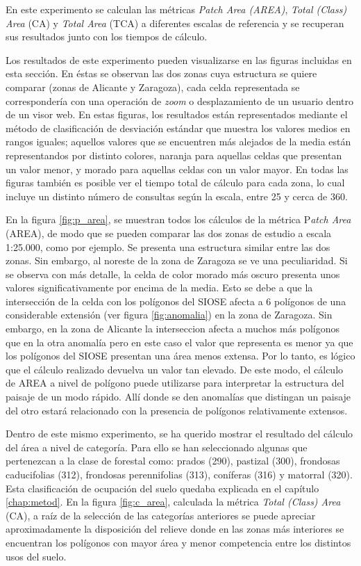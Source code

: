 En este experimento se calculan las métricas \textit{Patch Area (AREA)}, \textit{Total (Class) Area} (CA) y \textit{Total Area} (TCA) a diferentes escalas de referencia y se recuperan sus resultados junto con los tiempos de cálculo. 

Los resultados de este experimento pueden visualizarse en las figuras incluidas en esta sección. En éstas se observan las dos zonas cuya estructura se quiere comparar (zonas de Alicante y Zaragoza), cada celda representada se correspondería con una operación de \textit{zoom} o desplazamiento de un usuario dentro de un visor web. En estas figuras, los resultados están representados mediante el método de clasificación de desviación estándar que muestra los valores medios en rangos iguales; aquellos valores que se encuentren más alejados de la media están representandos por distinto colores, naranja para aquellas celdas que presentan un valor menor, y morado para aquellas celdas con un valor mayor. En todas las figuras también es posible ver el tiempo total de cálculo para cada zona, lo cual incluye un distinto número de consultas según la escala, entre 25 y cerca de 360.

En la figura \ref{fig:p_area}, se muestran todos los cálculos de la métrica P\textit{atch Area} (AREA), de modo que se pueden comparar las dos zonas de estudio a escala 1:25.000, como por ejemplo. Se presenta una estructura similar entre las dos zonas. Sin embargo, al noreste de la zona de Zaragoza se ve una peculiaridad. Si se observa con más detalle, la celda de color morado más oscuro presenta unos valores significativamente por encima de la media. Esto se debe a que la intersección de la celda con los polígonos del SIOSE afecta a 6 polígonos de una considerable extensión (ver figura \ref{fig:anomalia}) en la zona de Zaragoza. Sin embargo, en la zona de Alicante la interseccion afecta a muchos más polígonos que en la otra anomalía pero en este caso el valor que representa es menor ya que los polígonos del SIOSE presentan una área menos extensa. Por lo tanto, es lógico que el cálculo realizado devuelva un valor tan elevado. De este modo, el cálculo de AREA a nivel de polígono puede utilizarse para interpretar la estructura del paisaje de un modo rápido. Allí donde se den anomalías que distingan un paisaje del otro estará relacionado con la presencia de polígonos relativamente extensos.

Dentro de este mismo experimento, se ha querido mostrar el resultado del cálculo del área a nivel de categoría. Para ello se han seleccionado algunas que pertenezcan a la clase de forestal como: prados (290), pastizal (300), frondosas caducifolias (312), frondosas perennifolias (313), coníferas (316) y matorral (320). Esta clasificación de ocupación del suelo quedaba explicada en el capítulo \ref{chap:metod}. En la figura \ref{fig:c_area}, calculada la métrica \textit{Total (Class) Area} (CA), a raíz de la selección de las categorías anteriores se puede apreciar aproximadamente la disposición del relieve donde en las zonas más interiores se encuentran los polígonos con mayor área y menor competencia entre los distintos usos del suelo.

